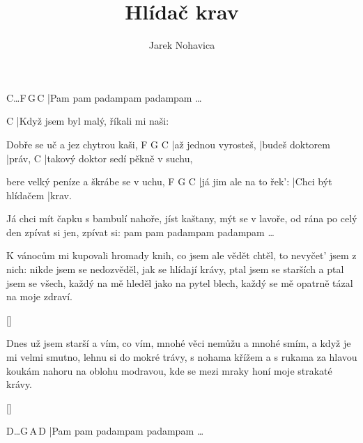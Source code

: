\documentclass{song}
\title{Hlídač krav}
\author{Jarek Nohavica}
\begin{document}
\strophe
C\quad\ldots\quad F\,G\,C
|Pam pam padampam padampam \ldots
\endstrophe

\strophe
C
|Když jsem byl malý, říkali mi naši:

Dobře se uč a jez chytrou kaši,
F                    G               C
|až jednou vyrosteš, |budeš doktorem |práv,
C
|takový doktor sedí pěkně v suchu,

bere velký peníze a škrábe se v uchu,
F                       G                  C
|já jim ale na to řek': |Chci být hlídačem |krav.
\endstrophe

Já chci mít čapku s bambulí nahoře,
jíst kaštany, mýt se v lavoře,
od rána po celý den zpívat si jen,
zpívat si: pam pam padampam padampam \ldots
\endstrophe

\strophe*
K vánocům mi kupovali hromady knih,
co jsem ale vědět chtěl, to nevyčet' jsem z nich:
nikde jsem se nedozvěděl, jak se hlídají krávy,
ptal jsem se starších a ptal jsem se všech,
každý na mě hleděl jako na pytel blech,
každý se mě opatrně tázal na moje zdraví.
\endstrophe

\ref{}

\strophe*
Dnes už jsem starší a vím, co vím,
mnohé věci nemůžu a mnohé smím,
a když je mi velmi smutno, lehnu si do mokré trávy,
s nohama křížem a s rukama za hlavou
koukám nahoru na oblohu modravou,
kde se mezi mraky honí moje strakaté krávy.
\endstrophe

\ref{}

\strophe
D\quad\ldots\quad G\,A\,D
|Pam pam padampam padampam \ldots
\endstrophe
\end{document}
